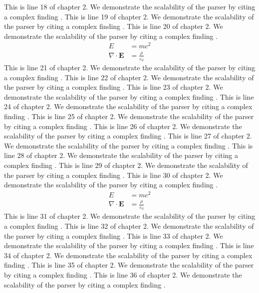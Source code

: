 This is line 18 of chapter 2. We demonstrate the scalability of the parser by citing a complex finding \cite{ref2_18}.
This is line 19 of chapter 2. We demonstrate the scalability of the parser by citing a complex finding \cite{ref2_19}.
This is line 20 of chapter 2. We demonstrate the scalability of the parser by citing a complex finding \cite{ref2_20}.
\begin{align*}
  E &= mc^2 \\
  \nabla \cdot \mathbf{E} &= \frac{\rho}{\varepsilon_0}
\end{align*}
This is line 21 of chapter 2. We demonstrate the scalability of the parser by citing a complex finding \cite{ref2_21}.
This is line 22 of chapter 2. We demonstrate the scalability of the parser by citing a complex finding \cite{ref2_22}.
This is line 23 of chapter 2. We demonstrate the scalability of the parser by citing a complex finding \cite{ref2_23}.
This is line 24 of chapter 2. We demonstrate the scalability of the parser by citing a complex finding \cite{ref2_24}.
This is line 25 of chapter 2. We demonstrate the scalability of the parser by citing a complex finding \cite{ref2_25}.
This is line 26 of chapter 2. We demonstrate the scalability of the parser by citing a complex finding \cite{ref2_26}.
This is line 27 of chapter 2. We demonstrate the scalability of the parser by citing a complex finding \cite{ref2_27}.
This is line 28 of chapter 2. We demonstrate the scalability of the parser by citing a complex finding \cite{ref2_28}.
This is line 29 of chapter 2. We demonstrate the scalability of the parser by citing a complex finding \cite{ref2_29}.
This is line 30 of chapter 2. We demonstrate the scalability of the parser by citing a complex finding \cite{ref2_30}.
\begin{align*}
  E &= mc^2 \\
  \nabla \cdot \mathbf{E} &= \frac{\rho}{\varepsilon_0}
\end{align*}
This is line 31 of chapter 2. We demonstrate the scalability of the parser by citing a complex finding \cite{ref2_31}.
This is line 32 of chapter 2. We demonstrate the scalability of the parser by citing a complex finding \cite{ref2_32}.
This is line 33 of chapter 2. We demonstrate the scalability of the parser by citing a complex finding \cite{ref2_33}.
This is line 34 of chapter 2. We demonstrate the scalability of the parser by citing a complex finding \cite{ref2_34}.
This is line 35 of chapter 2. We demonstrate the scalability of the parser by citing a complex finding \cite{ref2_35}.
This is line 36 of chapter 2. We demonstrate the scalability of the parser by citing a complex finding \cite{ref2_36}.
